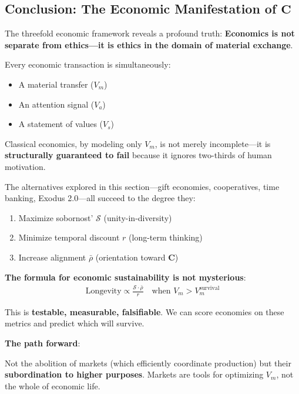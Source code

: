 \documentclass[11pt,a4paper]{article}
\theoremstyle{definition}
\theoremstyle{remark}
\begin{document}
\begin{enumerate}
\vspace{2em}

\subsection{Conclusion: The Economic Manifestation of \(\mathbf{C}\)}

The threefold economic framework reveals a profound truth: \textbf{Economics is not separate from ethics—it is ethics in the domain of material exchange}.

Every economic transaction is simultaneously:
\begin{itemize}
    \item A material transfer (\(V_m\))
    \item An attention signal (\(V_a\))
    \item A statement of values (\(V_s\))
\end{itemize}

Classical economics, by modeling only \(V_m\), is not merely incomplete—it is \textbf{structurally guaranteed to fail} because it ignores two-thirds of human motivation.

The alternatives explored in this section—gift economies, cooperatives, time banking, Exodus 2.0—all succeed to the degree they:
\begin{enumerate}
    \item Maximize sobornost' \(\mathcal{S}\) (unity-in-diversity)
    \item Minimize temporal discount \(r\) (long-term thinking)
    \item Increase alignment \(\bar{\rho}\) (orientation toward \(\mathbf{C}\))
\end{enumerate}

\textbf{The formula for economic sustainability is not mysterious}:
\begin{align}
\text{Longevity} \propto \frac{\mathcal{S} \cdot \bar{\rho}}{r} \quad \text{when } V_m > V_m^{\text{survival}}
\end{align}

This is \textbf{testable, measurable, falsifiable}. We can score economies on these metrics and predict which will survive.

\textbf{The path forward}:

Not the abolition of markets (which efficiently coordinate production) but their \textbf{subordination to higher purposes}. Markets are tools for optimizing \(V_m\), not the whole of economic life.


\end{enumerate}
\end{document}
